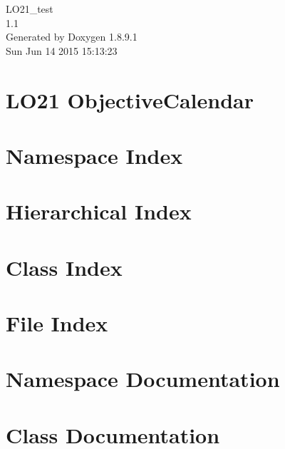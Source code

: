 \documentclass[twoside]{book}
\newcommand{\+}{\discretionary{\mbox{\scriptsize$\hookleftarrow$}}{}{}}
\newcommand{\clearemptydoublepage}{%
  \newpage{\pagestyle{empty}\cleardoublepage}%
}
\begin{document}
\hypersetup{pageanchor=false,
             bookmarks=true,
             bookmarksnumbered=true,
             pdfencoding=unicode
            }
\begin{titlepage}
\vspace*{7cm}
\begin{center}%
{\Large L\+O21\+\_\+test \\[1ex]\large 1.\+1 }\\
\vspace*{1cm}
{\large Generated by Doxygen 1.8.9.1}\\
\vspace*{0.5cm}
{\small Sun Jun 14 2015 15:13:23}\\
\end{center}
\end{titlepage}
\clearemptydoublepage
\tableofcontents
\clearemptydoublepage
{}
\hypersetup{pageanchor=true}

\chapter{L\+O21 Objective\+Calendar}
\label{md__r_e_a_d_m_e}
\hypertarget{md__r_e_a_d_m_e}{}

\chapter{Namespace Index}

\chapter{Hierarchical Index}

\chapter{Class Index}

\chapter{File Index}

\chapter{Namespace Documentation}


\chapter{Class Documentation}


















\end{document}
